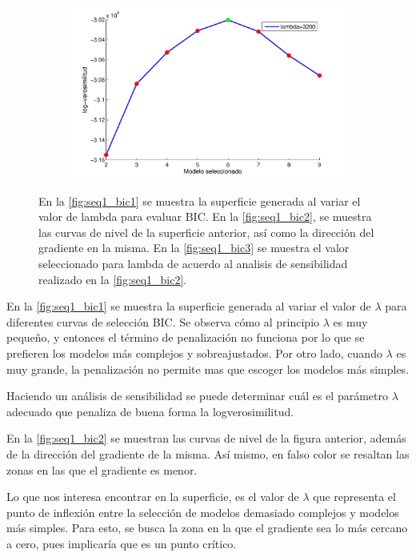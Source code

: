 \begin{figure}[t!]
{\begin{subfigure}[b]{0.6\textwidth}
    \includegraphics[width=\textwidth]{gfx/chap6/cuervobic3} 
    \caption{}
    \label{fig:seq1_bic3}
  \end{subfigure}
  \hspace{0.6\textwidth}
  }
  \caption{En la \autoref{fig:seq1_bic1} se muestra la superficie generada al variar el valor de lambda para evaluar BIC. En la \autoref{fig:seq1_bic2}, se muestra las curvas de nivel de la superficie anterior, así como la dirección del gradiente en la misma. En la \autoref{fig:seq1_bic3} se muestra el valor seleccionado para lambda de acuerdo al analisis de sensibilidad realizado en la \autoref{fig:seq1_bic2}.}
  \label{fig:seq1_bic}
\end{figure}

En la \autoref{fig:seq1_bic1} se muestra la superficie generada al variar el valor de $\lambda$ para diferentes curvas de selección BIC. Se observa cómo al principio $\lambda$ es muy pequeño, y entonces el término de penalización no funciona por lo que se prefieren los modelos más complejos y sobreajustados. Por otro lado, cuando $\lambda$ es muy grande, la penalización no permite mas que escoger los modelos más simples.

Haciendo un análisis de sensibilidad se puede determinar cuál es el parámetro $\lambda$ adecuado que penaliza de buena forma la logverosimilitud.

En la \autoref{fig:seq1_bic2} se muestran las curvas de nivel de la figura anterior, además de la dirección del gradiente de la misma. Así mismo, en falso color se resaltan las zonas en las que el gradiente es menor. 

Lo que nos interesa encontrar en la superficie, es el valor de $\lambda$ que representa el punto de inflexión entre la selección de modelos demasiado complejos y modelos más simples. Para esto, se busca la zona en la que el gradiente sea lo más cercano a cero, pues implicaría que es un punto crítico.

